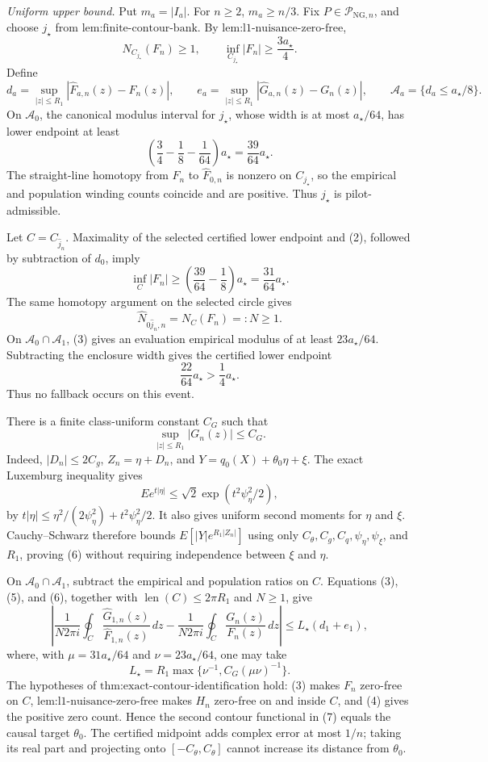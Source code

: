 \emph{Uniform upper bound.} Put \(m_a=|I_a|\). For \(n\ge2\), \(m_a\ge n/3\). Fix \(P\in\mathcal P_{\mathrm{NG},n}\), and choose \(j_{\star}\) from \(\text{lem:finite-contour-bank}\). By \(\text{lem:l1-nuisance-zero-free}\),
\[
 N_{C_{j_{\star}}}(F_n)\ge1,
 \qquad
 \inf_{C_{j_{\star}}}|F_n|\ge\frac{3a_{\star}}4.
 \tag{1}
\]
Define
\[
 d_a=\sup_{|z|\le R_1}|\widehat F_{a,n}(z)-F_n(z)|,
 \qquad
 e_a=\sup_{|z|\le R_1}|\widehat G_{a,n}(z)-G_n(z)|,
 \qquad
 \mathcal A_a=\{d_a\le a_{\star}/8\}.
\]
On \(\mathcal A_0\), the canonical modulus interval for \(j_{\star}\), whose width is at most \(a_{\star}/64\), has lower endpoint at least
\[
 \left(\frac34-\frac18-\frac1{64}\right)a_{\star}
 =\frac{39}{64}a_{\star}.
 \tag{2}
\]
The straight-line homotopy from \(F_n\) to \(\widehat F_{0,n}\) is nonzero on \(C_{j_{\star}}\), so the empirical and population winding counts coincide and are positive. Thus \(j_{\star}\) is pilot-admissible.

Let \(C=C_{\widehat j_n}\). Maximality of the selected certified lower endpoint and (2), followed by subtraction of \(d_0\), imply
\[
 \inf_C|F_n|
 \ge\left(\frac{39}{64}-\frac18\right)a_{\star}
 =\frac{31}{64}a_{\star}.
 \tag{3}
\]
The same homotopy argument on the selected circle gives
\[
 \widehat N_{0\widehat j_n,n}=N_C(F_n)=:N\ge1.
 \tag{4}
\]
On \(\mathcal A_0\cap\mathcal A_1\), (3) gives an evaluation empirical modulus of at least \(23a_{\star}/64\). Subtracting the enclosure width gives the certified lower endpoint
\[
 \frac{22}{64}a_{\star}>\frac14a_{\star}.
 \tag{5}
\]
Thus no fallback occurs on this event.

There is a finite class-uniform constant \(C_G\) such that
\[
 \sup_{|z|\le R_1}|G_n(z)|\le C_G.
 \tag{6}
\]
Indeed, \(|D_n|\le2C_g\), \(Z_n=\eta+D_n\), and \(Y=q_0(X)+\theta_0\eta+\xi\). The exact Luxemburg inequality gives
\[
 E e^{t|\eta|}\le\sqrt2\exp(t^2\psi_{\eta}^2/2),
\]
by \(t|\eta|\le\eta^2/(2\psi_{\eta}^2)+t^2\psi_{\eta}^2/2\). It also gives uniform second moments for \(\eta\) and \(\xi\). Cauchy--Schwarz therefore bounds \(E[|Y|e^{R_1|Z_n|}]\) using only \(C_{\theta},C_g,C_q,\psi_{\eta},\psi_{\xi}\), and \(R_1\), proving (6) without requiring independence between \(\xi\) and \(\eta\).

On \(\mathcal A_0\cap\mathcal A_1\), subtract the empirical and population ratios on \(C\). Equations (3), (5), and (6), together with \(\operatorname{len}(C)\le2\pi R_1\) and \(N\ge1\), give
\[
 \left|
 \frac{1}{N2\pi i}\oint_C
 \frac{\widehat G_{1,n}(z)}{\widehat F_{1,n}(z)}\,dz
 -
 \frac{1}{N2\pi i}\oint_C
 \frac{G_n(z)}{F_n(z)}\,dz
 \right|
 \le L_{\star}(d_1+e_1),
 \tag{7}
\]
where, with \(\mu=31a_{\star}/64\) and \(\nu=23a_{\star}/64\), one may take
\[
 L_{\star}=R_1\max\{\nu^{-1},C_G(\mu\nu)^{-1}\}.
\]
The hypotheses of \(\text{thm:exact-contour-identification}\) hold: (3) makes \(F_n\) zero-free on \(C\), \(\text{lem:l1-nuisance-zero-free}\) makes \(H_n\) zero-free on and inside \(C\), and (4) gives the positive zero count. Hence the second contour functional in (7) equals the causal target \(\theta_0\). The certified midpoint adds complex error at most \(1/n\); taking its real part and projecting onto \([-C_{\theta},C_{\theta}]\) cannot increase its distance from \(\theta_0\).

